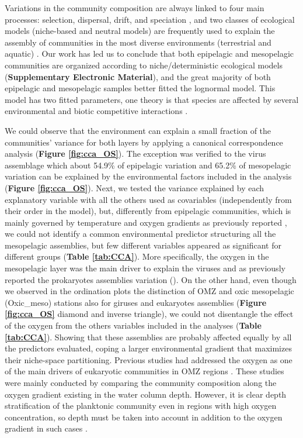 \documentclass[fleqn,10pt]{wlscirep}
\begin{document}
Variations in the community composition are always linked to four main processes: selection, dispersal, drift, and speciation \cite{vellend_conceptual_2010}, and two classes of ecological models (niche-based and neutral models) are frequently used to explain the assembly of communities in the most diverse environments (terrestrial and aquatic) \cite{chave_neutral_2004, mcgill_empirical_2006}. Our work has led us to conclude that both epipelagic and mesopelagic communities are organized according to niche/deterministic ecological models (\textbf{Supplementary Electronic Material}), and the great majority of both epipelagic and mesopelagic samples better fitted the lognormal model. This model has two fitted parameters, one theory is that species are affected by several environmental and biotic competitive interactions \cite{wilson_methods_1991}. 

We could observe that the environment can explain a small fraction of the communities’ variance for both layers by applying a canonical correspondence analysis (\textbf{Figure \ref{fig:cca_OS}}). The exception was verified to the virus assemblage which about 54.9\% of epipelagic variation and 65.2\% of mesopelagic variation can be explained by the environmental factors included in the analysis (\textbf{Figure \ref{fig:cca_OS}}). Next, we tested the variance explained by each explanatory variable with all the others used as covariables (independently from their order in the model), but, differently from epipelagic communities, which is mainly governed by temperature and oxygen gradients as previously reported \cite{sunagawa_structure_2015,gregory_marine_2019,ibarbalz_global_2019,giner_marked_2020, ghiglione_pole--pole_2012}, we could not identify a common environmental predictor structuring all the mesopelagic assemblies, but few different variables appeared as significant for different groups (\textbf{Table \ref{tab:CCA}}). More specifically, the oxygen in the mesopelagic layer was the main driver to explain the viruses and as previously reported the prokaryotes assemblies variation (\cite{wright_microbial_2012, ulloa_pelagic_2013, aldunate_oxygen_2018}). On the other hand, even though we observed in the ordination plots the distinction of OMZ and oxic mesopelagic (Oxic\_meso) stations also for giruses and eukaryotes assemblies (\textbf{Figure \ref{fig:cca_OS}} diamond and inverse triangle), we could not disentangle the effect of the oxygen from the others variables included in the analyses (\textbf{Table \ref{tab:CCA}}). Showing that these assemblies are probably affected equally by all the predictors evaluated, coping a larger environmental gradient that maximizes their niche-space partitioning. Previous studies had addressed the oxygen as one of the main drivers of eukaryotic communities in OMZ regions \cite{de_la_iglesia_distinct_2020, orsi_effect_2012, parris_microbial_2014}. These studies were mainly conducted by comparing the community composition along the oxygen gradient existing in the water column depth. However, it is clear depth stratification of the planktonic community even in regions with high oxygen concentration, so depth must be taken into account in addition to the oxygen gradient in such cases \cite{schnetzer_depth_2011}.
\end{document}
